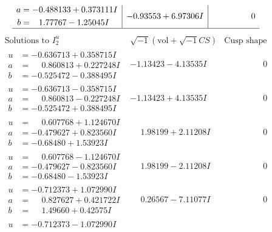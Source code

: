 \documentclass[1p]{elsarticle_modified}
\theoremstyle{definition}
\newcommand{\I}{\sqrt{-1}}
\begin{document}
$$\begin{array}{c|c|c}
\begin{aligned}
a &= -0.488133 + 0.373111 I \\
b &= \phantom{-}1.77767 - 1.25045 I\end{aligned}
 & -0.93553 + 6.97306 I & \phantom{-0.000000 } 0\\
 \hline 
 \end{array}$$\newpage$$\begin{array}{c|c|c}  
\text{Solutions to }I^u_{2}& \I (\text{vol} + \sqrt{-1}CS) & \text{Cusp shape}\\
 \hline 
\begin{aligned}
u &= -0.636713 + 0.358715 I \\
a &= \phantom{-}0.860813 + 0.227248 I \\
b &= -0.525472 - 0.388495 I\end{aligned}
 & -1.13423 - 4.13535 I & \phantom{-0.000000 } 0 \\ \hline\begin{aligned}
u &= -0.636713 - 0.358715 I \\
a &= \phantom{-}0.860813 - 0.227248 I \\
b &= -0.525472 + 0.388495 I\end{aligned}
 & -1.13423 + 4.13535 I & \phantom{-0.000000 } 0 \\ \hline\begin{aligned}
u &= \phantom{-}0.607768 + 1.124670 I \\
a &= -0.479627 + 0.823560 I \\
b &= -0.68480 + 1.53923 I\end{aligned}
 & \phantom{-}1.98199 + 2.11208 I & \phantom{-0.000000 } 0 \\ \hline\begin{aligned}
u &= \phantom{-}0.607768 - 1.124670 I \\
a &= -0.479627 - 0.823560 I \\
b &= -0.68480 - 1.53923 I\end{aligned}
 & \phantom{-}1.98199 - 2.11208 I & \phantom{-0.000000 } 0 \\ \hline\begin{aligned}
u &= -0.712373 + 1.072990 I \\
a &= \phantom{-}0.827627 + 0.421722 I \\
b &= \phantom{-}1.49660 + 0.42575 I\end{aligned}
 & \phantom{-}0.26567 - 7.11077 I & \phantom{-0.000000 } 0 \\ \hline\begin{aligned}
u &= -0.712373 - 1.072990 I \\

\end{aligned}
\end{array}$$
\end{document}
